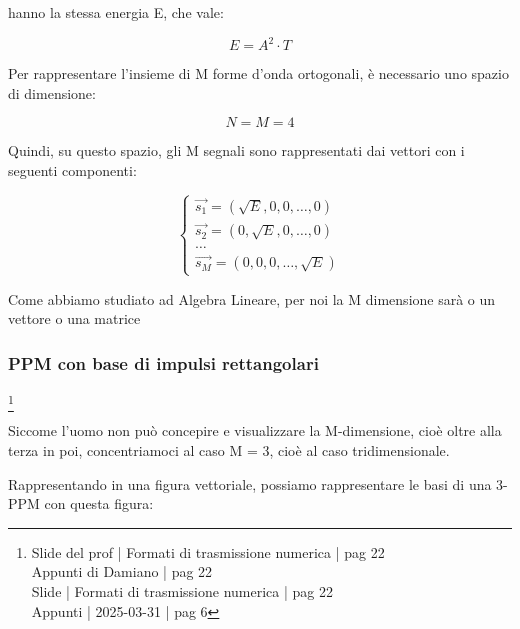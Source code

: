 hanno la stessa energia E, che vale: 

{
    \Large 
    \begin{equation}
        E = A^{2} \cdot T
    \end{equation}
}

Per rappresentare l'insieme di M forme d'onda ortogonali, 
è necessario uno spazio di dimensione: 

{
    \Large 
    \begin{equation}
        N = M = 4
    \end{equation}
}

Quindi, su questo spazio, gli M segnali sono rappresentati dai vettori con i seguenti componenti: 

{
    \Large 
    \begin{equation}
        \begin{cases}
        \overrightarrow{s_1} = \left( \sqrt{E}, 0, 0, \dots, 0 \right)  
        \\
        \overrightarrow{s_2} = \left( 0 , \sqrt{E}, 0, \dots, 0 \right)  
        \\
        \dots
        \\
        \overrightarrow{s_M} = \left( 0 , 0, 0, \dots, \sqrt{E} \right)  
        \end{cases}
    \end{equation}
}

\begin{tcolorbox}
    Come abbiamo studiato ad Algebra Lineare, 
    per noi la M dimensione sarà o un vettore o una matrice
\end{tcolorbox}

\newpage 

\subsubsection{PPM con base di impulsi rettangolari}
\footnote{Slide del prof | Formati di trasmissione numerica | pag 22 \\  
Appunti di Damiano | pag 22 \\
Slide | Formati di trasmissione numerica | pag  22\\
Appunti | 2025-03-31 | pag 6
}

Siccome l'uomo non può concepire e visualizzare la M-dimensione, cioè oltre alla terza in poi, 
concentriamoci al caso M = 3, cioè al caso tridimensionale. \newline 

Rappresentando in una figura vettoriale, possiamo rappresentare le basi di una 3-PPM con questa figura: 

